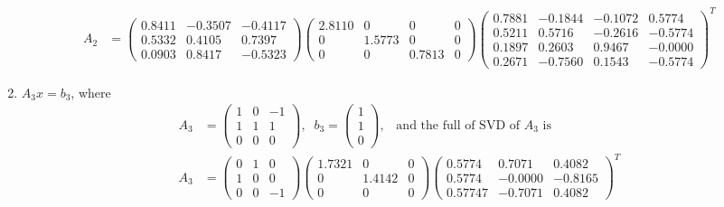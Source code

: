\documentclass[11pt]{article}
\begin{document}
\begin{enumerate}
\begin{align*}
A_2 &= \begin{pmatrix} 0.8411  & -0.3507 &  -0.4117 \\ 0.5332  & 0.4105  &  0.7397 \\ 0.0903  &  0.8417 &  -0.5323 \end{pmatrix} 
		\begin{pmatrix}  2.8110  &   0 &  0 & 0 \\ 0  & 1.5773 &  0  &  0 \\ 0 & 0  & 0.7813 & 0 \end{pmatrix} 
	 	\begin{pmatrix} 0.7881  & -0.1844 &  -0.1072  &  0.5774 \\  0.5211  &  0.5716 &  -0.2616 &  -0.5774 \\ 0.1897  &  0.2603 &   0.9467   & -0.0000 \\ 0.2671  & -0.7560 &   0.1543   & -0.5774 \end{pmatrix}^T 
\end{align*}
\item $A_3 x = b_3$, where
\begin{align*}
A_3 &= \begin{pmatrix} 1 & 0 & -1 \\ 1 & 1 & 1 \\ 0 & 0 & 0 \end{pmatrix}, \;\; b_3 = \begin{pmatrix} 1 \\ 1 \\ 0 \end{pmatrix}, \;\;\; \text{and the full of SVD of $A_3$ is} \\
A_3 &=  \begin{pmatrix}  0  &  1 &  0 \\ 1  & 0  & 0 \\ 0 &   0 & -1 \end{pmatrix} 
              \begin{pmatrix} 1.7321 &  0   &   0 \\ 0  &  1.4142     &    0 \\ 0     &    0 &  0 \end{pmatrix}
              \begin{pmatrix}0.5774  &  0.7071  &  0.4082 \\ 0.5774  & -0.0000  & -0.8165 \\  0.5774 7 & -0.7071 &   0.4082 \end{pmatrix}^T
\end{align*}
\end{enumerate}
\end{document}
